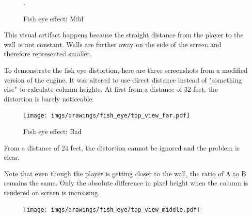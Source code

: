 \begin{minipage}{\textwidth}

    \begin{figure}[H]
    \centering
     \caption{Fish eye effect: Mild}. \label{fig:mips}
     \end{figure} 


    \begin{minipage}{.4\textwidth}
    This visual artifact happens because the straight distance from the player to the wall is not constant. Walls are further away on the side of the screen and therefore represented smaller.\\
    \par
    To demonstrate the fish eye distortion, here are three screenshots from a modified version of the engine. It was altered to use direct distance  instead of "something else" to calculate column heights. At first from a distance of 32 feet, the distortion is barely noticeable.\\
     \end{minipage}
    \begin{minipage}{.6\textwidth}
    \begin{figure}[H]
      \begin{flushright}
     \texttt{[image: imgs/drawings/fish\_eye/top\_view\_far.pdf]}
       \end{flushright}
    \end{figure}
    \end{minipage}
\end{minipage}
\par



\begin{minipage}{\textwidth}
\begin{figure}[H]
\centering
 \caption{Fish eye effect: Bad} \label{fig:mips}
 \end{figure}
\begin{minipage}{.4\textwidth}
From a distance of 24 feet, the distortion cannot be ignored and the problem is clear.\\
\par
Note that even though the player is getting closer to the wall, the ratio of A to B remains the same. Only the absolute difference in pixel height when the column is rendered on screen is increasing.
 \end{minipage}
\begin{minipage}{.6\textwidth}
\begin{figure}[H]
  \begin{flushright}
 \texttt{[image: imgs/drawings/fish\_eye/top\_view\_middle.pdf]}
 \end{flushright}
\end{figure}
\end{minipage}
\end{minipage}




